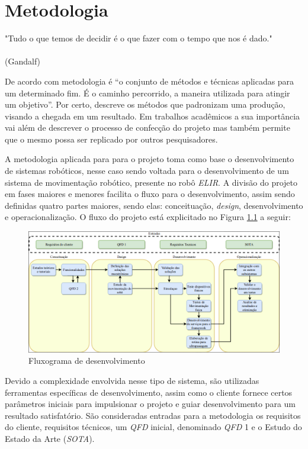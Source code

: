 \chapter{Metodologia}
\label{chap:meto}
\begin{flushright}
	"Tudo o que temos de decidir é o que fazer com o tempo que nos é dado." \\
	\ \\
	(Gandalf)
\end{flushright}

De acordo com \cite{maia} metodologia é “o conjunto de métodos e técnicas aplicadas para um determinado fim. É o caminho percorrido, a maneira utilizada para atingir um objetivo”. Por certo, descreve os métodos que padronizam uma produção, visando a chegada em um resultado. Em trabalhos acadêmicos a sua importância vai além de descrever o processo de confecção do projeto mas também permite que o mesmo possa ser replicado por outros pesquisadores.

A metodologia aplicada para para o projeto toma como base o desenvolvimento de sistemas robóticos, nesse caso sendo voltada para o desenvolvimento de um sistema de movimentação robótico, presente no robô \textit{ELIR}. A divisão do projeto em fases maiores e menores facilita o fluxo para o desenvolvimento, assim sendo definidas quatro partes maiores, sendo elas: conceituação, \textit{design}, desenvolvimento e operacionalização. O fluxo do projeto está explicitado no Figura \ref{fig:flux_desen} a seguir: 


\begin{figure}[!htb]
	\centering
	\includegraphics[scale=0.45]{Figures/flux_desen.png}
	\caption{Fluxograma de desenvolvimento}
	\label{fig:flux_desen}
\end{figure}	

Devido a complexidade envolvida nesse tipo de sistema, são utilizadas ferramentas específicas de desenvolvimento, assim como o cliente fornece certos parâmetros iniciais para impulsionar o projeto e guiar desenvolvimento para um resultado satisfatório. São consideradas entradas para a metodologia os requisitos do cliente, requisitos técnicos, um \textit{QFD} inicial, denominado \textit{QFD} 1 e o Estudo do Estado da Arte (\textit{SOTA}).


